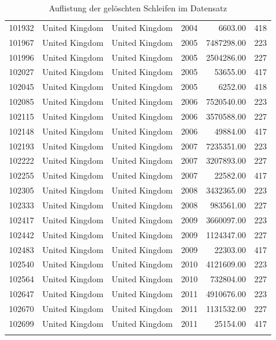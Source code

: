 \documentclass[a4paper,ngerman,oneside,titlepage,bibliography=totoc,11pt]{scrreprt}
\begin{document}
\begin{longtable}{rllrrr}
  101932 & United Kingdom & United Kingdom & 2004 & 6603.00 & 418 \\ 
  101967 & United Kingdom & United Kingdom & 2005 & 7487298.00 & 223 \\ 
  101996 & United Kingdom & United Kingdom & 2005 & 2504286.00 & 227 \\ 
  102027 & United Kingdom & United Kingdom & 2005 & 53655.00 & 417 \\ 
  102045 & United Kingdom & United Kingdom & 2005 & 6252.00 & 418 \\ 
  102085 & United Kingdom & United Kingdom & 2006 & 7520540.00 & 223 \\ 
  102115 & United Kingdom & United Kingdom & 2006 & 3570588.00 & 227 \\ 
  102148 & United Kingdom & United Kingdom & 2006 & 49884.00 & 417 \\ 
  102193 & United Kingdom & United Kingdom & 2007 & 7235351.00 & 223 \\ 
  102222 & United Kingdom & United Kingdom & 2007 & 3207893.00 & 227 \\ 
  102255 & United Kingdom & United Kingdom & 2007 & 22582.00 & 417 \\ 
  102305 & United Kingdom & United Kingdom & 2008 & 3432365.00 & 223 \\ 
  102333 & United Kingdom & United Kingdom & 2008 & 983561.00 & 227 \\ 
  102417 & United Kingdom & United Kingdom & 2009 & 3660097.00 & 223 \\ 
  102442 & United Kingdom & United Kingdom & 2009 & 1124347.00 & 227 \\ 
  102483 & United Kingdom & United Kingdom & 2009 & 22303.00 & 417 \\ 
  102540 & United Kingdom & United Kingdom & 2010 & 4121609.00 & 223 \\ 
  102564 & United Kingdom & United Kingdom & 2010 & 732804.00 & 227 \\ 
  102647 & United Kingdom & United Kingdom & 2011 & 4910676.00 & 223 \\ 
  102670 & United Kingdom & United Kingdom & 2011 & 1131532.00 & 227 \\ 
  102699 & United Kingdom & United Kingdom & 2011 & 25154.00 & 417 \\ 
   \hline
	\caption{Auflistung der gelöschten Schleifen im Datensatz}
\end{longtable}

 



\newpage
\listoffigures
\newpage
\listoftables
\end{document}
